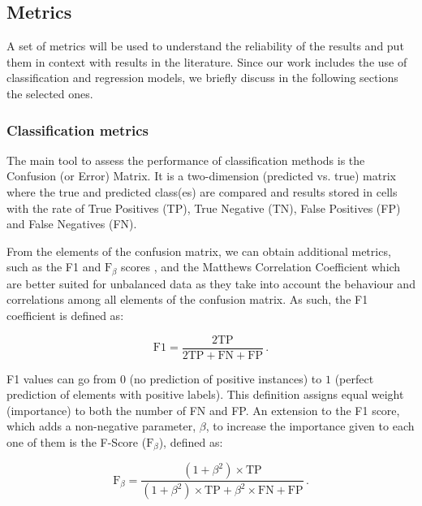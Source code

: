 \documentclass{aa}
\begin{document}
\subsection{Metrics}\label{sec:metrics}

A set of metrics will be used to understand the reliability of the results and put them in context with results in the literature. 
Since our work includes the use of classification and regression models, we briefly discuss in the following sections the selected ones.

\subsubsection{Classification metrics}\label{sec:metrics_classfication}

The main tool to assess the performance of classification methods is the Confusion (or Error) Matrix. It is a two-dimension (predicted vs. true) matrix where the true and predicted class(es) are compared and results stored in cells with the rate of True Positives (TP), True Negative (TN), False Positives (FP) and False Negatives (FN).

From the elements of the confusion matrix, we can obtain additional metrics, such as the F1 and $\mathrm{F}_{\beta}$ scores \citep{10.2307/1932409, sorenson1948method, van1979information}, and the Matthews Correlation Coefficient \citep[MCC;][]{10.2307/2340126, nla.cat-vn81100, MATTHEWS1975442} which are better suited for unbalanced data as they take into account the behaviour and correlations among all elements of the confusion matrix.
As such, the F1 coefficient is defined as: 

\begin{equation}\label{eq:f1}
\mathrm{F1} = \frac{2 \mathrm{TP}}{2 \mathrm{TP} + \mathrm{FN} + \mathrm{FP}}\,.
\end{equation}

\noindent 
F1 values can go from $0$ (no prediction of positive instances) to $1$ (perfect prediction of elements with positive labels). This definition assigns equal weight (importance) to both the number of FN and FP. An extension to the F1 score, which adds a non-negative parameter, $\beta$, to increase the importance given to each one of them is the F-Score ($\mathrm{F}_{\beta}$), defined as:

\begin{equation}\label{eq:f_beta}
\mathrm{F}_{\beta} = \frac{(1 + \beta^{2}) \times \mathrm{TP}}{(1 + \beta^{2}) \times \mathrm{TP} + \beta^{2} \times \mathrm{FN} + \mathrm{FP}}\,.
\end{equation}
\end{document}
